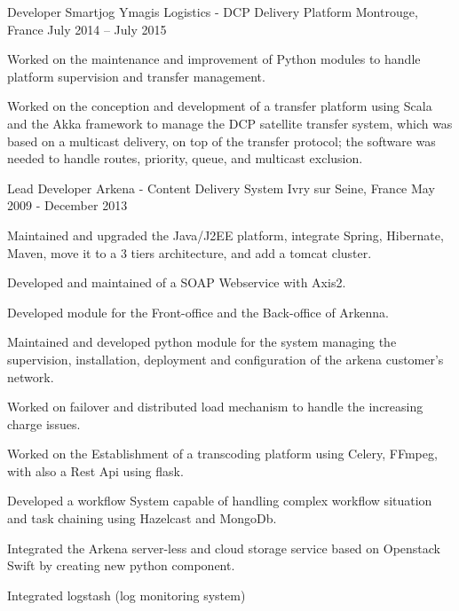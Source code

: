 \begin{cventries}
  \cventry
    {Developer} %
    {Smartjog Ymagis Logistics - DCP Delivery Platform} %
    {Montrouge, France} %
    {July 2014 – July 2015} %
    {
      \begin{cvitems} %
        \item {Worked on the maintenance and improvement of Python modules to handle platform supervision and transfer management.}
        \item {Worked on the conception and development of a transfer platform using Scala and the Akka framework to manage the DCP satellite transfer system, which was based on a multicast delivery, on top of the transfer protocol; the software was needed to handle routes, priority, queue, and multicast exclusion.}
      \end{cvitems} 
    }

  \cventry
    {Lead Developer} %
    {Arkena - Content Delivery System} %
    {Ivry sur Seine, France} %
    {May 2009 - December 2013} %
    {
      \begin{cvitems} %
        \item {Maintained and upgraded the Java/J2EE platform, integrate Spring, Hibernate, Maven, move it to a 3 tiers architecture, and add a tomcat cluster.}
        \item {Developed and maintained of a SOAP Webservice with Axis2.}
        \item {Developed module for the Front-office and the Back-office of Arkenna.}
        \item {Maintained and developed python module for the system managing the supervision, installation, deployment and configuration of the arkena customer’s network.}
        \item {Worked on failover and distributed load mechanism to handle the increasing charge issues.}
        \item {Worked on the Establishment of a transcoding platform using Celery, FFmpeg, with also a Rest Api using flask.}
        \item {Developed a workflow System capable of handling complex workflow situation and task chaining using Hazelcast and MongoDb.}
        \item {Integrated the Arkena server-less and cloud storage service based on Openstack Swift by creating new python component.}
        \item {Integrated logstash (log monitoring system)}
      \end{cvitems}
    }


\end{cventries}

